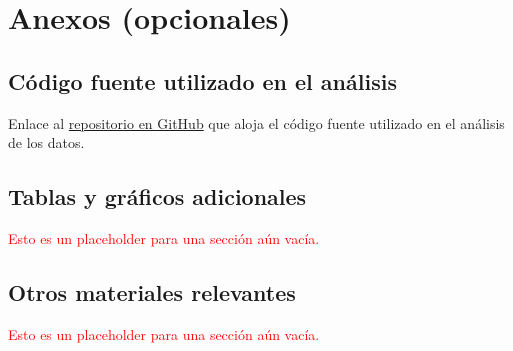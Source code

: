 \documentclass[a4paper]{report}
\begin{document}
\printbibliography[heading=bibintoc] %



\chapter*{Anexos (opcionales)}


\section{Código fuente utilizado en el análisis}
Enlace al \href{https://github.com/bettachini/tallerTesis/tree/main/sismosURL}{repositorio en GitHub} que aloja el código fuente utilizado en el análisis de los datos.



\section{Tablas y gráficos adicionales}
\textcolor{red}{Esto es un placeholder para una sección aún vacía.}


\section{Otros materiales relevantes}
\textcolor{red}{Esto es un placeholder para una sección aún vacía.}
\end{document}
